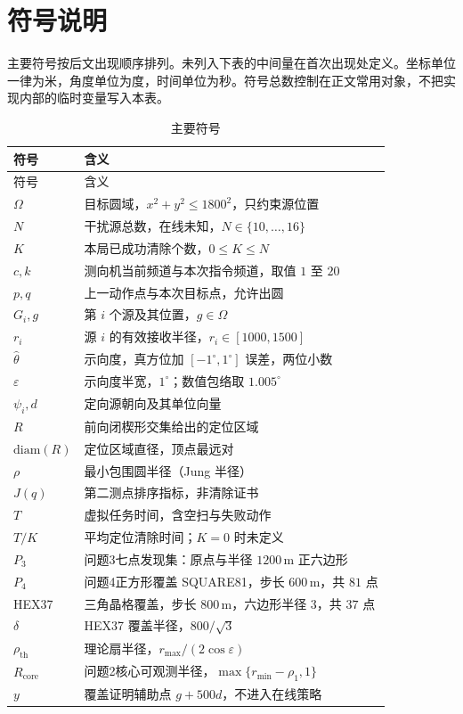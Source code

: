 \section{符号说明}

主要符号按后文出现顺序排列。未列入下表的中间量在首次出现处定义。坐标单位一律为米，角度单位为度，时间单位为秒。符号总数控制在正文常用对象，不把实现内部的临时变量写入本表。

\begin{center}
\begin{longtable}{p{2.2cm}p{10.8cm}}
\caption{主要符号}\\
\hline
符号 & 含义\\
\hline
\endfirsthead
\hline
符号 & 含义\\
\hline
\endhead
\hline
\endfoot
$\Omega$ & 目标圆域，$x^2+y^2\le 1800^2$，只约束源位置\\
$N$ & 干扰源总数，在线未知，$N\in\{10,\ldots,16\}$\\
$K$ & 本局已成功清除个数，$0\le K\le N$\\
$c,k$ & 测向机当前频道与本次指令频道，取值 $1$ 至 $20$\\
$p,q$ & 上一动作点与本次目标点，允许出圆\\
$G_i,g$ & 第 $i$ 个源及其位置，$g\in\Omega$\\
$r_i$ & 源 $i$ 的有效接收半径，$r_i\in[1000,1500]$\\
$\hat\theta$ & 示向度，真方位加 $[-1^\circ,1^\circ]$ 误差，两位小数\\
$\varepsilon$ & 示向度半宽，$1^\circ$；数值包络取 $1.005^\circ$\\
$\psi_i,d$ & 定向源朝向及其单位向量\\
$R$ & 前向闭楔形交集给出的定位区域\\
$\mathrm{diam}(R)$ & 定位区域直径，顶点最远对\\
$\rho$ & 最小包围圆半径（Jung 半径）\\
$J(q)$ & 第二测点排序指标，非清除证书\\
$T$ & 虚拟任务时间，含空扫与失败动作\\
$T/K$ & 平均定位清除时间；$K=0$ 时未定义\\
$P_3$ & 问题3七点发现集：原点与半径 $1200\,\mathrm{m}$ 正六边形\\
$P_4$ & 问题4正方形覆盖 SQUARE81，步长 $600\,\mathrm{m}$，共 $81$ 点\\
HEX37 & 三角晶格覆盖，步长 $800\,\mathrm{m}$，六边形半径 $3$，共 $37$ 点\\
$\delta$ & HEX37 覆盖半径，$800/\sqrt{3}$\\
$\rho_{\mathrm{th}}$ & 理论扇半径，$r_{\max}/(2\cos\varepsilon)$\\
$R_{\mathrm{core}}$ & 问题2核心可观测半径，$\max\{r_{\min}-\rho_1,1\}$\\
$y$ & 覆盖证明辅助点 $g+500d$，不进入在线策略\\
\end{longtable}
\end{center}

